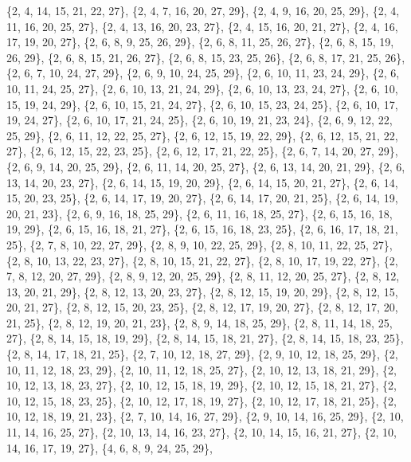\documentclass[11pt,a4paper]{article}
\begin{document}
{\{2, 4, 14, 15, 21, 22, 27\}, \{2, 4, 7, 16, 20, 27, 29\}, \{2, 4, 9, 16, 20, 25, 29\}, \{2, 4, 11, 16, 20, 25, 27\}, \{2, 4, 13, 16, 20, 23, 27\},
\{2, 4, 15, 16, 20, 21, 27\}, \{2, 4, 16, 17, 19, 20, 27\}, \{2, 6, 8, 9, 25, 26, 29\}, \{2, 6, 8, 11, 25, 26, 27\}, \{2, 6, 8, 15, 19, 26, 29\},
\{2, 6, 8, 15, 21, 26, 27\}, \{2, 6, 8, 15, 23, 25, 26\}, \{2, 6, 8, 17, 21, 25, 26\}, \{2, 6, 7, 10, 24, 27, 29\}, \{2, 6, 9, 10, 24, 25, 29\},
\{2, 6, 10, 11, 23, 24, 29\}, \{2, 6, 10, 11, 24, 25, 27\}, \{2, 6, 10, 13, 21, 24, 29\}, \{2, 6, 10, 13, 23, 24, 27\}, \{2, 6, 10, 15, 19, 24, 29\},
\{2, 6, 10, 15, 21, 24, 27\}, \{2, 6, 10, 15, 23, 24, 25\}, \{2, 6, 10, 17, 19, 24, 27\}, \{2, 6, 10, 17, 21, 24, 25\}, \{2, 6, 10, 19, 21, 23, 24\},
\{2, 6, 9, 12, 22, 25, 29\}, \{2, 6, 11, 12, 22, 25, 27\}, \{2, 6, 12, 15, 19, 22, 29\}, \{2, 6, 12, 15, 21, 22, 27\}, \{2, 6, 12, 15, 22, 23, 25\},
\{2, 6, 12, 17, 21, 22, 25\}, \{2, 6, 7, 14, 20, 27, 29\}, \{2, 6, 9, 14, 20, 25, 29\}, \{2, 6, 11, 14, 20, 25, 27\}, \{2, 6, 13, 14, 20, 21, 29\},
\{2, 6, 13, 14, 20, 23, 27\}, \{2, 6, 14, 15, 19, 20, 29\}, \{2, 6, 14, 15, 20, 21, 27\}, \{2, 6, 14, 15, 20, 23, 25\}, \{2, 6, 14, 17, 19, 20, 27\},
\{2, 6, 14, 17, 20, 21, 25\}, \{2, 6, 14, 19, 20, 21, 23\}, \{2, 6, 9, 16, 18, 25, 29\}, \{2, 6, 11, 16, 18, 25, 27\}, \{2, 6, 15, 16, 18, 19, 29\},
\{2, 6, 15, 16, 18, 21, 27\}, \{2, 6, 15, 16, 18, 23, 25\}, \{2, 6, 16, 17, 18, 21, 25\}, \{2, 7, 8, 10, 22, 27, 29\}, \{2, 8, 9, 10, 22, 25, 29\},
\{2, 8, 10, 11, 22, 25, 27\}, \{2, 8, 10, 13, 22, 23, 27\}, \{2, 8, 10, 15, 21, 22, 27\}, \{2, 8, 10, 17, 19, 22, 27\}, \{2, 7, 8, 12, 20, 27, 29\},
\{2, 8, 9, 12, 20, 25, 29\}, \{2, 8, 11, 12, 20, 25, 27\}, \{2, 8, 12, 13, 20, 21, 29\}, \{2, 8, 12, 13, 20, 23, 27\}, \{2, 8, 12, 15, 19, 20, 29\},
\{2, 8, 12, 15, 20, 21, 27\}, \{2, 8, 12, 15, 20, 23, 25\}, \{2, 8, 12, 17, 19, 20, 27\}, \{2, 8, 12, 17, 20, 21, 25\}, \{2, 8, 12, 19, 20, 21, 23\},
\{2, 8, 9, 14, 18, 25, 29\}, \{2, 8, 11, 14, 18, 25, 27\}, \{2, 8, 14, 15, 18, 19, 29\}, \{2, 8, 14, 15, 18, 21, 27\}, \{2, 8, 14, 15, 18, 23, 25\},
\{2, 8, 14, 17, 18, 21, 25\}, \{2, 7, 10, 12, 18, 27, 29\}, \{2, 9, 10, 12, 18, 25, 29\}, \{2, 10, 11, 12, 18, 23, 29\}, \{2, 10, 11, 12, 18, 25, 27\},
\{2, 10, 12, 13, 18, 21, 29\}, \{2, 10, 12, 13, 18, 23, 27\}, \{2, 10, 12, 15, 18, 19, 29\}, \{2, 10, 12, 15, 18, 21, 27\}, \{2, 10, 12, 15, 18, 23, 25\},
\{2, 10, 12, 17, 18, 19, 27\}, \{2, 10, 12, 17, 18, 21, 25\}, \{2, 10, 12, 18, 19, 21, 23\}, \{2, 7, 10, 14, 16, 27, 29\}, \{2, 9, 10, 14, 16, 25, 29\},
\{2, 10, 11, 14, 16, 25, 27\}, \{2, 10, 13, 14, 16, 23, 27\}, \{2, 10, 14, 15, 16, 21, 27\}, \{2, 10, 14, 16, 17, 19, 27\}, \{4, 6, 8, 9, 24, 25, 29\},
}
\end{document}

